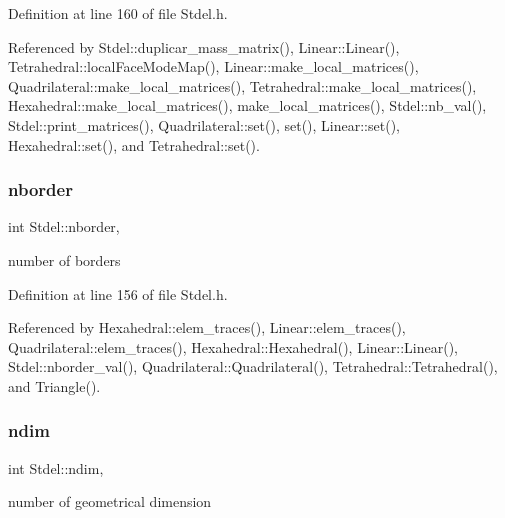 Definition at line 160 of file Stdel.\+h.



Referenced by Stdel\+::duplicar\+\_\+mass\+\_\+matrix(), Linear\+::\+Linear(), Tetrahedral\+::local\+Face\+Mode\+Map(), Linear\+::make\+\_\+local\+\_\+matrices(), Quadrilateral\+::make\+\_\+local\+\_\+matrices(), Tetrahedral\+::make\+\_\+local\+\_\+matrices(), Hexahedral\+::make\+\_\+local\+\_\+matrices(), make\+\_\+local\+\_\+matrices(), Stdel\+::nb\+\_\+val(), Stdel\+::print\+\_\+matrices(), Quadrilateral\+::set(), set(), Linear\+::set(), Hexahedral\+::set(), and Tetrahedral\+::set().

\mbox{\label{classStdel_ad0f111a2ba3d9415618c8408da3fc100}} 
\subsubsection{\texorpdfstring{nborder}{nborder}}
{\footnotesize\ttfamily int Stdel\+::nborder\hspace{0.3cm}{\ttfamily [protected]}, {\ttfamily [inherited]}}



number of borders 



Definition at line 156 of file Stdel.\+h.



Referenced by Hexahedral\+::elem\+\_\+traces(), Linear\+::elem\+\_\+traces(), Quadrilateral\+::elem\+\_\+traces(), Hexahedral\+::\+Hexahedral(), Linear\+::\+Linear(), Stdel\+::nborder\+\_\+val(), Quadrilateral\+::\+Quadrilateral(), Tetrahedral\+::\+Tetrahedral(), and Triangle().

\mbox{\label{classStdel_a912f36b591d847eed2531a3b3a51a520}} 
\subsubsection{\texorpdfstring{ndim}{ndim}}
{\footnotesize\ttfamily int Stdel\+::ndim\hspace{0.3cm}{\ttfamily [protected]}, {\ttfamily [inherited]}}



number of geometrical dimension 



